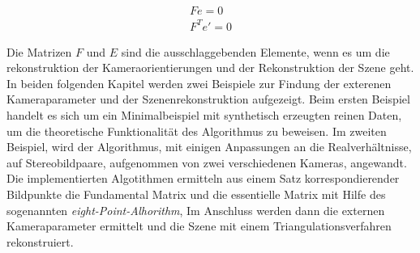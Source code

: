 \begin{gather}
Fe = 0\\
F^Te' = 0
\end{gather}

Die Matrizen $F$ und $E$ sind die ausschlaggebenden Elemente, wenn es um die rekonstruktion der Kameraorientierungen und der Rekonstruktion der Szene geht. In beiden folgenden Kapitel werden zwei Beispiele zur Findung der exterenen Kameraparameter und der Szenenrekonstruktion aufgezeigt. Beim ersten Beispiel handelt es sich um ein Minimalbeispiel mit synthetisch erzeugten reinen Daten, um die theoretische Funktionalität des Algorithmus zu beweisen. Im zweiten Beispiel, wird der Algorithmus, mit einigen Anpassungen an die Realverhältnisse, auf Stereobildpaare, aufgenommen von zwei verschiedenen Kameras, angewandt. Die implementierten Algotithmen ermitteln aus einem Satz korrespondierender Bildpunkte die Fundamental Matrix und die essentielle Matrix mit Hilfe des sogenannten \textit{eight-Point-Alhorithm}, Im Anschluss werden dann die externen Kameraparameter ermittelt und die Szene mit einem Triangulationsverfahren rekonstruiert. 

